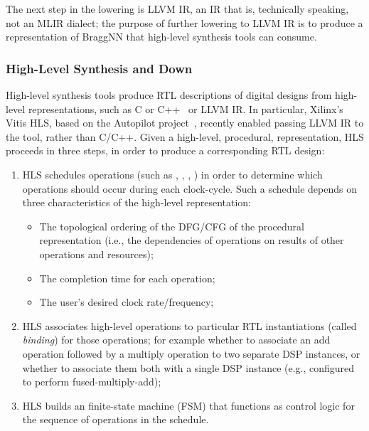 The next step in the lowering is LLVM IR, an IR that is, technically speaking, not an MLIR dialect; the purpose of further lowering to LLVM IR is to produce a representation of BraggNN that high-level synthesis tools can consume.

\subsubsection{High-Level Synthesis and Down}\label{subsec:hlsdown}

High-level synthesis tools produce RTL descriptions of digital designs from high-level representations, such as C or C++~\cite{10.1145/2514740, ferrandi2021bambu} or LLVM IR.
In particular, Xilinx's Vitis HLS, based on the Autopilot project~\cite{Zhang2008}, recently enabled passing LLVM IR to the tool, rather than C/C++.
Given a high-level, procedural, representation, HLS proceeds in three steps, in order to produce a corresponding RTL design:
\begin{enumerate}
	\item HLS schedules operations (such as , , , ) in order to determine which operations should occur during each clock-cycle. Such a schedule depends on three characteristics of the high-level representation:
	      \begin{itemize}
		      \item The topological ordering of the DFG/CFG of the procedural representation (i.e., the dependencies of operations on results of other operations and resources);
		      \item The completion time for each operation;
		      \item The user's desired clock rate/frequency;
	      \end{itemize}
	\item HLS associates high-level operations to particular RTL instantiations (called \emph{binding}) for those operations; for example whether to associate an add operation followed by a multiply operation to two separate DSP instances, or whether to associate them both with a single DSP instance (e.g., configured to perform fused-multiply-add);
	\item HLS builds an finite-state machine (FSM) that functions as control logic for the sequence of operations in the schedule.
\end{enumerate}

